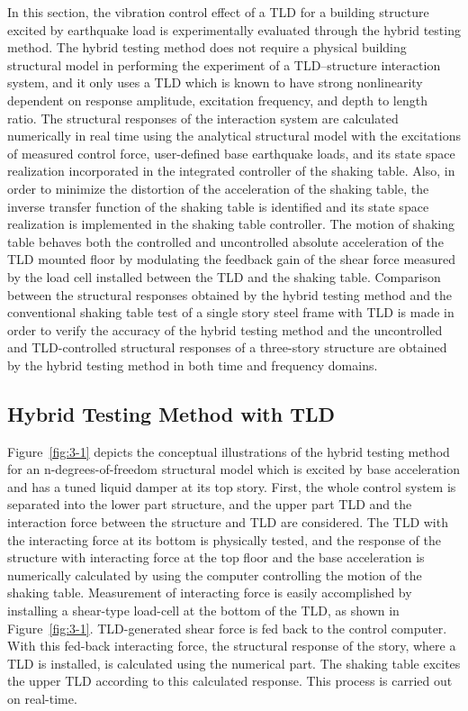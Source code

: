 In this section, the vibration control effect of a TLD for a building structure excited by earthquake load is experimentally evaluated through the hybrid testing method. The hybrid testing method does not require a physical building structural model in performing the experiment of a TLD–structure interaction system, and it only uses a TLD which is known to have strong nonlinearity dependent on response amplitude, excitation frequency, and depth to length ratio\citep{yu1999non}. The structural responses of the interaction system are calculated numerically in real time using the analytical structural model with the excitations of measured control force, user-defined base earthquake loads, and its state space realization incorporated in the integrated controller of the shaking table. Also, in order to minimize the distortion of the acceleration of the shaking table, the inverse transfer function of the shaking table is identified and its state space realization is implemented in the shaking table controller. The motion of shaking table behaves both the controlled and uncontrolled absolute acceleration of the TLD mounted floor by modulating the feedback gain of the shear force measured by the load cell installed between the TLD and the shaking table. Comparison between the structural responses obtained by the hybrid testing method and the conventional shaking table test of a single story steel frame with TLD is made in order to verify the accuracy of the hybrid testing method and the uncontrolled and TLD-controlled structural responses of a three-story structure are obtained by the hybrid testing method in both time and frequency domains.

\subsection{Hybrid Testing Method with TLD}
Figure~\ref{fig:3-1} depicts the conceptual illustrations of the hybrid testing method for an n-degrees-of-freedom structural model which is excited by base acceleration and has a tuned liquid damper at its top story. First, the whole control system is separated into the lower part structure, and the upper part TLD and the interaction force between the structure and TLD are considered. The TLD with the interacting force at its bottom is physically tested, and the response of the structure with interacting force at the top floor and the base acceleration is numerically calculated by using the computer controlling the motion of the shaking table. Measurement of interacting force is easily accomplished by installing a shear-type load-cell at the bottom of the TLD, as shown in Figure~\ref{fig:3-1}. TLD-generated shear force is fed back to the control computer. With this fed-back interacting force, the structural response of the story, where a TLD is installed, is calculated using the numerical part. The shaking table excites the upper TLD according to this calculated response. This process is carried out on real-time.

